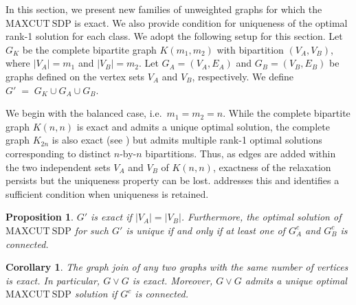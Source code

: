 \documentclass[a4paper,fleqn]{cas-sc}
\newcommand{\1}{\mathbf{1}}
\newtheorem{proposition}[theorem]{Proposition}
\newtheorem{corollary}[theorem]{Corollary}
\newcommand{\ignore}[1]{}
\begin{document}
In this section, we present new families of unweighted graphs for which the $\mathrm{MAXCUT\ SDP}$ is exact. We also provide condition for uniqueness of the optimal rank-1 solution for each class. We adopt the following setup for this section. Let $G_K$ be the complete bipartite graph $K(m_1,m_2)$ with bipartition $(V_A,V_B)$, where $|V_A| = m_1$ and $|V_B| = m_2$. Let $G_A = (V_A,E_A)$ and $G_B = (V_B,E_B)$ be graphs defined on the vertex sets $V_A$ and $V_B$, respectively. We define $G' \;=\; G_K \cup G_A \cup G_B$.\vspace{1mm}

We begin with the balanced case, i.e.\ \(m_1=m_2=n\). While the complete bipartite graph \( K(n,n) \) is exact and admits a unique optimal solution, the complete graph \( K_{2n} \) is also exact (see ) but admits multiple rank-1 optimal solutions corresponding to distinct \( n \)-by-\( n \) bipartitions. Thus, as edges are added within the two independent sets \(V_A\) and \(V_B\) of $K(n,n)$, exactness of the relaxation persists but the uniqueness property can be lost.  addresses this and identifies a sufficient condition when uniqueness is retained. \ignore{We give a sketch of the proof of \Cref{claim:1} and defer the full proof to \Cref{proof1}.}

\begin{proposition}\label{prop1}
    \label{claim:1}
    $G'$ is exact if $|V_A| = |V_B|$. Furthermore, the optimal solution of $\mathrm{MAXCUT\ SDP}$ for such $G'$  is unique if and only if at least one of $G_A^c$ and $G_B^c$ is connected.
\end{proposition}

\begin{corollary}
The graph join of any two graphs with the same number of vertices is exact. In particular, $G \vee G$ is exact. Moreover, $G \vee G$ admits a unique optimal $\mathrm{MAXCUT\ SDP}$ solution if $G^c$ is connected.
\end{corollary}
\end{document}
